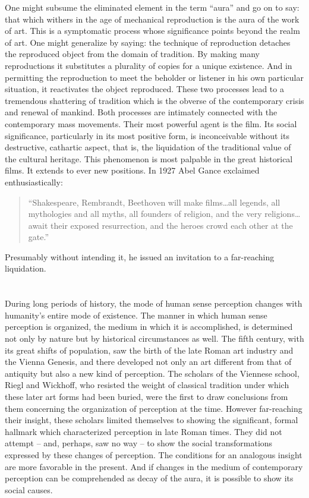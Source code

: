 \documentclass[11pt, letterpaper]{article}
\begin{document}
One might subsume the eliminated element in the term “aura” and go on to say:
that which withers in the age of mechanical reproduction is the aura of the
work of art. This is a symptomatic process whose significance points beyond the
realm of art. One might generalize by saying: the technique of reproduction
detaches the reproduced object from the domain of tradition. By making many
reproductions it substitutes a plurality of copies for a unique existence. And
in permitting the reproduction to meet the beholder or listener in his own
particular situation, it reactivates the object reproduced. These two processes
lead to a tremendous shattering of tradition which is the obverse of the
contemporary crisis and renewal of mankind. Both processes are intimately
connected with the contemporary mass movements. Their most powerful agent is
the film. Its social significance, particularly in its most positive form, is
inconceivable without its destructive, cathartic aspect, that is, the
liquidation of the traditional value of the cultural heritage. This phenomenon
is most palpable in the great historical films. It extends to ever new
positions. In 1927 Abel Gance exclaimed enthusiastically:
\begin{quote}
	“Shakespeare, Rembrandt, Beethoven will make films\ldots all legends, all
	mythologies and all myths, all founders of religion, and the very religions\ldots
	await their exposed resurrection, and the heroes crowd each other at the gate.”
\end{quote}
Presumably without intending it, he issued an invitation to a far-reaching liquidation.

\section{}

During long periods of history, the mode of human sense perception changes with
humanity’s entire mode of existence. The manner in which human sense perception
is organized, the medium in which it is accomplished, is determined not only by
nature but by historical circumstances as well. The fifth century, with its
great shifts of population, saw the birth of the late Roman art industry and
the Vienna Genesis, and there developed not only an art different from that of
antiquity but also a new kind of perception. The scholars of the Viennese
school, Riegl and Wickhoff, who resisted the weight of classical tradition
under which these later art forms had been buried, were the first to draw
conclusions from them concerning the organization of perception at the time.
However far-reaching their insight, these scholars limited themselves to
showing the significant, formal hallmark which characterized perception in late
Roman times. They did not attempt – and, perhaps, saw no way – to show the
social transformations expressed by these changes of perception. The conditions
for an analogous insight are more favorable in the present. And if changes in
the medium of contemporary perception can be comprehended as decay of the aura,
it is possible to show its social causes.
\end{document}
